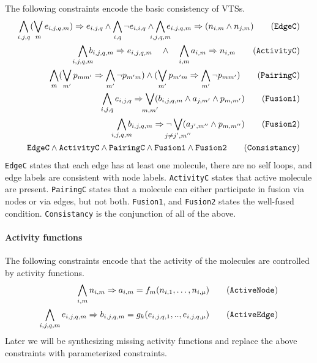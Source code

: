 The following constraints encode the basic consistency of VTSs.
\begin{align}
  \bigwedge\limits_{i,j,q} (\bigvee_m e_{i,j,q,m} )\limplies e_{i,j,q}
  \land
  \bigwedge\limits_{i,q} \neg e_{i,i,q}
  \land
  \bigwedge\limits_{\mathclap{i,j,q,m}} e_{i,j,q,m} \limplies (n_{i,m} \land n_{j,m} )
  \tag{\texttt{EdgeC}}\label{eq:c0}\\
  \bigwedge\limits_{\mathclap{i,j,q,m}} b_{i,j,q,m} \limplies e_{i,j,q,m} \quad\land\quad
  \bigwedge\limits_{i,m} a_{i,m} \limplies n_{i,m}
  \tag{\texttt{ActivityC}}\label{eq:c4}\\
  \bigwedge\limits_{m} 
  (\Lor\limits_{m'} p_{mm'} \limplies \Land_{m'} \lnot p_{m'm} ) \land
  (\Lor\limits_{m'} p_{m'm} \limplies \Land_{m'} \lnot p_{mm'} )
  \tag{\texttt{PairingC}}\label{eq:c3}\\
  \bigwedge\limits_{i,j,q} e_{i,j,q} \limplies
  \bigvee_{\mathclap{m,m^{\prime}}} (b_{i,j,q,m} \land a_{j,m^{\prime}} \land p_{m,m^{\prime}})
  \tag{\texttt{Fusion1}}\label{eq:fuse1} \\
\bigwedge\limits_{\mathclap{i,j,q,m}} b_{i,j,q,m} \limplies \neg 
  \bigvee_{\mathclap{j \neq j^{\prime}, m^{\prime\prime}}} ( a_{j^{\prime},m^{\prime\prime}} \land p_{m,m^{\prime\prime}})
  \tag{\texttt{Fusion2}}\label{eq:fuse2} \\
  \texttt{EdgeC} \land
  \texttt{ActivityC} \land \texttt{PairingC} \land
  \texttt{Fusion1} \land \texttt{Fusion2} 
  \tag{\texttt{Consistancy}}\label{eq:c3}
\end{align}
\texttt{EdgeC} states that each edge has at least one molecule,
there are no self loops, and edge labels are consistent with node labels.   
\texttt{ActivityC} states that active molecule are present.
\texttt{PairingC} states that a molecule can either participate in fusion
via nodes or via edges, but not both.
\texttt{Fusion1}, and \texttt{Fusion2} states the well-fused condition.
\texttt{Consistancy} is the conjunction of all of the above.

\paragraph{Activity functions}
%
The following constraints encode that
the activity of the molecules are controlled by activity functions.
%
%
\begin{align}
\bigwedge\limits_{i,m} n_{i,m} \limplies a_{i,m} =  \nodef_m (n_{i,1},\dots,n_{i,\mu}) 
\tag{\texttt{ActiveNode}}\label{eq:anb}\\
   \bigwedge\limits_{i,j,q,m} e_{i,j,q,m} \limplies b_{i,j,q,m} = \edgef_k(e_{i,j,q,1}, .., e_{i,j,q,\mu} )
  \tag{\texttt{ActiveEdge}}\label{eq:aeb}
\end{align}
%
Later we will be synthesizing missing activity functions and replace the
above constraints with parameterized constraints.

